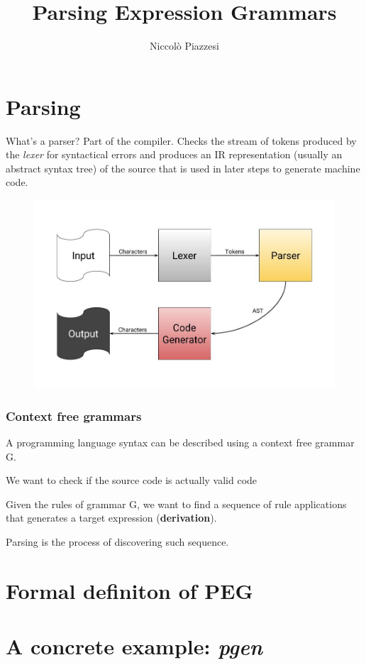 \documentclass{beamer}
\title{Parsing Expression Grammars}
\author{Niccolò Piazzesi}
\institute[UniPi]{
    Università degli Studi di Pisa \\
    Anno Accademico 2020-21
}
\begin{document}
    \begin{frame}
        \maketitle
    \end{frame}
    \section{Parsing}
    \begin{frame}
        \begin{block}{What's a parser?}
            Part of the compiler.
            Checks the stream of tokens produced by the \emph{lexer} for syntactical errors
            and produces an IR representation (usually an abstract syntax tree) of the source 
            that is used in later steps to generate machine code.
        \end{block}
        \begin{figure}
            \includegraphics[width=\textwidth]{img/parser.jpg}
        \end{figure}
    \end{frame}
    \begin{frame}
        \frametitle{Context free grammars}
        \begin{block}{}A programming language syntax can be described using a context free grammar G.\end{block}

        \begin{block}{}We want to check if the source code is actually valid code\end{block}
    \end{frame}
    \begin{frame}
        Given the rules of grammar G, we want to find a sequence of rule applications that generates a target expression (\textbf{derivation}).

        Parsing is the process of discovering such sequence.
    \end{frame}
    \section{Formal definiton of PEG}
    \section{A concrete example: \emph{pgen}}
\end{document}
